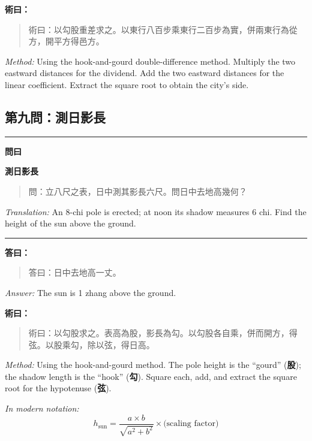 \documentclass[11pt,a4paper]{article}
\newenvironment{problem}[1][]{%
  \medskip\noindent\rule{\textwidth}{0.4pt}%
  \par\noindent\textbf{\color{sectioncolor}#1}\par\nopagebreak%
  \smallskip%
}{%
  \par\noindent\rule{\textwidth}{0.4pt}\medskip%
}
\newenvironment{answer}{%
  \medskip\noindent{\color{answercolor}\rule{0.5\textwidth}{0.5pt}}%
  \par\color{answercolor}%
}{%
  \par\medskip%
}
\newenvironment{method}{%
  \medskip\noindent{\color{methodcolor}\rule{0.5\textwidth}{0.5pt}}%
  \par\color{methodcolor}%
}{%
  \par\medskip%
}
\begin{document}
\begin{method}
\textbf{術曰：}

\begin{quote}
\textcolor{chinacolor}{%
術曰：以勾股重差求之。以東行八百步乘東行二百步為實，併兩東行為從方，開平方得邑方。
}
\end{quote}

\textit{Method:} Using the hook-and-gourd double-difference method. 
Multiply the two eastward distances for the dividend. Add the two 
eastward distances for the linear coefficient. Extract the square root 
to obtain the city's side.
\end{method}

\subsection*{第九問：測日影長}

\begin{problem}[\textbf{問曰}]
\textbf{\color{sectioncolor}測日影長}

\begin{quote}
\textcolor{chinacolor}{%
問：立八尺之表，日中測其影長六尺。問日中去地高幾何？
}
\end{quote}

\textit{Translation:} An 8-chi pole is erected; at noon its shadow measures 
6 chi. Find the height of the sun above the ground.
\end{problem}

\begin{answer}
\textbf{答曰：}

\begin{quote}
\textcolor{chinacolor}{%
答曰：日中去地高一丈。
}
\end{quote}

\textit{Answer:} The sun is 1 zhang above the ground.
\end{answer}

\begin{method}
\textbf{術曰：}

\begin{quote}
\textcolor{chinacolor}{%
術曰：以勾股求之。表高為股，影長為勾。以勾股各自乘，併而開方，得弦。以股乘勾，除以弦，得日高。
}
\end{quote}

\textit{Method:} Using the hook-and-gourd method. The pole height is the 
``gourd'' (\textbf{股}); the shadow length is the ``hook'' (\textbf{勾}). Square each, 
add, and extract the square root for the hypotenuse (\textbf{弦}).

\medskip
\textit{In modern notation:}
\[
h_{\text{sun}} = \frac{a \times b}{\sqrt{a^2 + b^2}} \times \text{(scaling factor)}
\]
\end{method}
\end{document}
